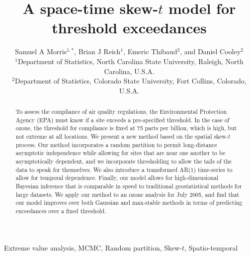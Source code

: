 \documentclass[useAMS,usenatbib,referee]{biom}
\title[A Space-time Skew-$t$ Model for Threshold Exceedances]{A space-time skew-$t$ model for threshold exceedances}
\author
{Samuel A Morris$^{1,*}$\email{samorris@ncsu.edu},
Brian J Reich$^{1}$,
Emeric Thibaud$^{2}$, and
Daniel Cooley$^{2}$\\
$^{1}$Department of Statistics, North Carolina State University, Raleigh, North Carolina, U.S.A. \\
$^{2}$Department of Statistics, Colorado State University, Fort Collins, Colorado, U.S.A.}
\begin{document}



\pagerange{\pageref{firstpage}--\pageref{lastpage}}

\label{firstpage}

\begin{abstract}
To assess the compliance of air quality regulations, the Environmental Protection Agency (EPA) must know if a site exceeds a pre-specified threshold.
In the case of ozone, the threshold for compliance is fixed at 75 parts per billion, which is high, but not extreme at all locations.
We present a new method based on the spatial skew-$t$ process.
Our method incorporates a random partition to permit long-distance asymptotic independence while allowing for sites that are near one another to be asymptotically dependent, and we incorporate thresholding to allow the tails of the data to speak for themselves.
We also introduce a transformed AR(1) time-series to allow for temporal dependence.
Finally, our model allows for high-dimensional Bayesian inference that is comparable in speed to traditional geostatistical methods for large datasets.
We apply our method to an ozone analysis for July 2005, and find that our model improves over both Gaussian and max-stable methods in terms of predicting exceedances over a fixed threshold.
\end{abstract}

\begin{keywords}
Extreme value analysis, MCMC, Random partition, Skew-$t$, Spatio-temporal
\end{keywords}

\maketitle
\end{document}
